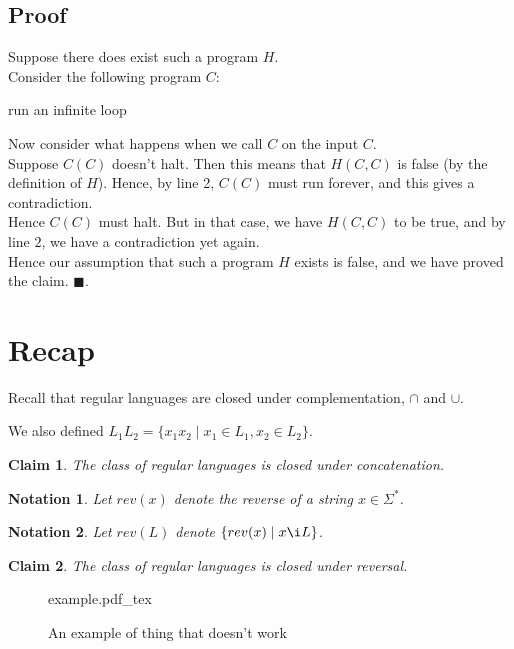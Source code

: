 \documentclass[a4paper]{article}
\newtheorem{claim}{Claim}
\newtheorem{notn}{Notation}
\newcommand{\nl}{\vspace{0.2cm}\\}
\newcommand{\incfig}[1]{%
    \def\svgwidth{\columnwidth}
    {#1.pdf_tex}
}
\begin{document}
\subsection{Proof}
Suppose there does exist such a program $H$.\nl
Consider the following program $C$:
\begin{algorithmic}[1]
            \State run an infinite loop
        \Else
            \State \Return
        \EndIf
    \EndFunction
\end{algorithmic}
Now consider what happens when we call $C$ on the input $C$.\nl
Suppose $C(C)$ doesn't halt. Then this means that $H(C, C)$ is false (by the definition of $H$).
Hence, by line 2, $C(C)$ must run forever, and this gives a contradiction.\nl
Hence $C(C)$ must halt. But in that case, we have $H(C, C)$ to be true, and by line $2$, we have a contradiction yet again.\nl
Hence our assumption that such a program $H$ exists is false, and we have proved the claim. $\blacksquare$.

\fi



\section{Recap}

Recall that regular languages are closed under complementation, $\cap$ and $\cup$.

We also defined $L_1 L_2 = \{x_1 x_2 \mid x_1 \in L_1, x_2 \in L_2\}$.

\begin{claim}
    The class of regular languages is closed under concatenation.
\end{claim}

\begin{notn}
    Let $rev(x)$ denote the reverse of a string $x \in \Sigma^*$.
\end{notn}

\begin{notn}
    Let $rev(L)$ denote $\{rev(x) \mid x \i L\}$.
\end{notn}

\begin{claim}
    The class of regular languages is closed under reversal.
\end{claim}

\begin{figure}[ht]
    \centering
    \incfig{example}
    \caption{An example of thing that doesn't work}
    \label{fig:example}
\end{figure}
\end{document}
